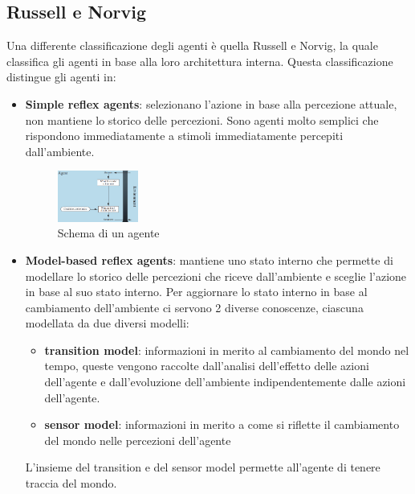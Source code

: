 \subsection{Russell e Norvig}
Una differente classificazione degli agenti è quella Russell e Norvig, la quale
classifica gli agenti in base alla loro architettura interna. Questa classificazione
distingue gli agenti in:
\begin{itemize}
    \item \textbf{Simple reflex agents}: selezionano l'azione in base alla percezione
        attuale, non mantiene lo storico delle percezioni. Sono agenti molto semplici
        che rispondono immediatamente a stimoli immediatamente percepiti dall'ambiente.  
          \begin{figure}[!h]
              \centering
              \includegraphics[width=0.25\textwidth]{./img/Agenti/SimpleReflexAgents.png}
              \caption{Schema di un agente}
              \label{fig:simpleReflex}
          \end{figure}
    \item \textbf{Model-based reflex agents}: mantiene uno stato interno che permette 
          di modellare lo storico delle percezioni che riceve dall'ambiente e sceglie
          l'azione in base al suo stato interno. Per aggiornare lo stato interno 
          in base al cambiamento dell'ambiente ci servono 2 diverse conoscenze, ciascuna
          modellata da due diversi modelli:
          \begin{itemize}
            \item \textbf{transition model}: informazioni in merito
            al cambiamento del mondo nel tempo, queste vengono raccolte dall'analisi
            dell'effetto delle azioni dell'agente e dall'evoluzione dell'ambiente 
            indipendentemente dalle azioni dell'agente.
            \item \textbf{sensor model}: informazioni in merito
            a come si riflette il cambiamento del mondo nelle percezioni dell'agente
          \end{itemize} 
          L'insieme del transition e del sensor model permette all'agente di tenere
          traccia del mondo.
          \begin{figure}[!h]
              \centering

\end{figure}
\end{itemize}
